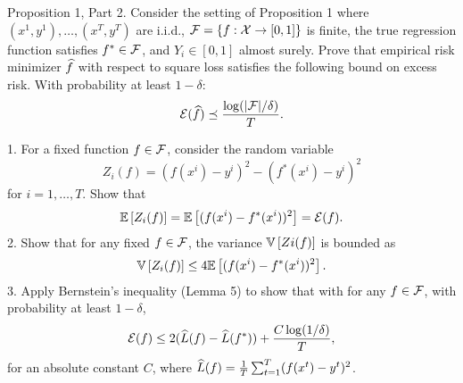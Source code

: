 \begin{exercise}[]{Proposition 1, Part 2.}
Consider the setting of Proposition 1 where $ (x^{1}, y^{1}),\ldots,(x^{T},y^{T})$ are i.i.d., $\mathcal{F} = \{f : \mathcal{X} \to [0,1] \}$ is finite,  
the true regression function satisfies $f^* \in \mathcal{F}$, and $Y_i \in [0, 1]$ almost surely. Prove that empirical risk minimizer $\widehat f$ with respect 
to square loss satisfies the following bound on excess risk. With probability at least $1 - \delta$:
\begin{equation*}
    \mathcal{E}(\widehat f) \preceq \frac{\log(|\mathcal{F}|/\delta)}{T}.
\end{equation*}
\end{exercise}

1. For a fixed function $f \in \mathcal{F}$, consider the random variable 
\[Z_i(f) = (f(x^i)-y^i)^2 -(f^*(x^i)-y^i)^2\]
 for $i=1,\ldots,T.$ Show that
 \[ \mathbb{E}\left[Z_i(f)\right] = \mathbb{E}\left[(f(x^i)- f^*(x^i))^2\right] = \mathcal{E}(f).\]
2. Show that for any fixed $f \in \mathcal{F}$, the variance $\mathbb{V}\left[Zi(f)\right]$ is bounded as
\[ \mathbb{V}\left[Z_i(f)\right]\leq 4\mathbb{E}\left[(f(x^i)-f^*(x^i))^2\right].\]
3. Apply Bernstein’s inequality (Lemma 5) to show that with for any $f \in \mathcal{F}$, with probability
at least $1-\delta$,
\[ \mathcal{E}(f) \leq 2(\widehat L(f)-\widehat L(f^*))+\frac{C \log(1/\delta)}{T},\] 
for an absolute constant $C$, where $\widehat L(f) = \frac{1}{T} \sum_{t=1}^T (f(x^t) - y^t)^2$.

